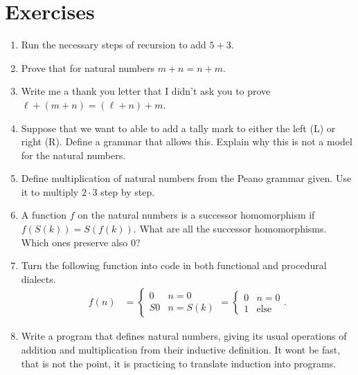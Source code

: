 \section*{Exercises}

\begin{enumerate}
    \item Run the necessary steps of recursion to add $5+3$.
    
    \item Prove that for natural numbers $m+n=n+m$.
    
    \item Write me a thank you letter that I didn't ask you to prove $\ell+(m+n)=(\ell+n)+m$.
    
    \item Suppose that we want to able to add a tally mark to either the left (L) or right (R).
    Define a grammar that allows this.  Explain why this is not a model for the natural numbers.

    \item Define multiplication of natural numbers from the Peano grammar given.  Use it to multiply $2\cdot 3$
    step by step.
    
    \item A function $f$ on the natural numbers is a successor homomorphism if 
    $f(S(k))=S(f(k))$.  What are all the successor homomorphisms.  Which ones preserve also $0$?
        
    \item Turn the following function into code in both functional and procedural dialects.
    \begin{align*}
        f(n) & = \begin{cases}
                    0 & n=0\\
                    S0 & n=S(k)
        \end{cases}
         =\begin{cases} 0 & n=0 \\ 1 & \text{else}\end{cases}.
    \end{align*}
    
    
    \item Write a program that defines natural numbers, giving its usual operations of addition 
    and multiplication from their inductive definition.  It wont be fast, that is not the point,
    it is practicing to translate induction into programs.
\end{enumerate}